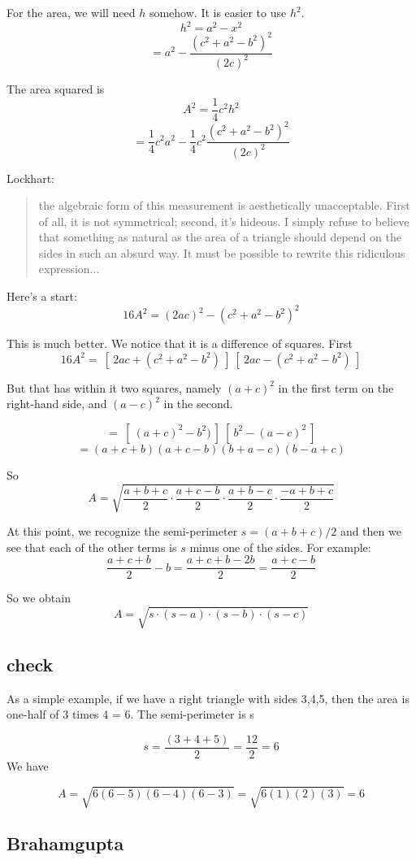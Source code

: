 \documentclass[11pt, oneside]{article}
\begin{document}
For the area, we will need $h$ somehow.  It is easier to use $h^2$.
\[ h^2 = a^2 - x^2 \]
\[ = a^2 - \frac{(c^2 + a^2-b^2)^2}{(2c)^2}  \]

The area squared is
\[ A^2 = \frac{1}{4}c^2 h^2 \]
\[ = \frac{1}{4} c^2 a^2 - \frac{1}{4} c^2 \frac{(c^2 + a^2-b^2)^2}{(2c)^2}  \]

Lockhart:

\begin{quote}
the algebraic form of this measurement is aesthetically unacceptable. First of all, it is not symmetrical; second, it's hideous. I simply refuse to believe that something as natural as the area of a triangle should depend on the sides in such an absurd way. It must be possible to rewrite this ridiculous expression...
\end{quote}

Here's a start:
\[ 16A^2 = (2ac)^2 - (c^2 + a^2-b^2)^2 \]

This is much better.  We notice that it is a difference of squares.  First
\[ 16A^2 = \ [ \ 2ac + (c^2 + a^2-b^2) \ ] \ [ \ 2ac - (c^2 + a^2-b^2) \ ]  \]

But that has within it two squares, namely $(a + c)^2$ in the first term on the right-hand side, and $(a - c)^2$ in the second.

\[ = \ [ \ (a + c)^2 -b^2) \ ] \ [ \ b^2 - (a - c)^2 \ ]  \]
\[ =  (a + c + b)(a + c - b)(b + a - c)(b - a + c) \]

So
\[ A = \sqrt{\frac{a + b + c}{2}  \cdot \frac{a + c - b}{2}  \cdot \frac{a + b - c}{2}  \cdot \frac{-a + b + c}{2} } \]

At this point, we recognize the semi-perimeter $s = (a + b + c)/2$ and then we see that each of the other terms is $s$ minus one of the sides.  For example:
\[ \frac{a + c + b}{2} - b = \frac{a + c + b - 2b}{2} = \frac{a + c - b}{2} \]

So we obtain
\[ A = \sqrt{s \cdot (s - a) \cdot (s - b) \cdot (s - c) } \]
\subsection*{check}
As a simple example, if we have a right triangle with sides 3,4,5, then the area is one-half of 3 times 4 = 6.  The semi-perimeter is s

\[ s = \frac{(3 + 4 + 5)}{2} = \frac{12}{2} = 6 \]
We have

\[ A =  \sqrt { 6 (6-5) (6-4) (6-3) } =  \sqrt { 6 (1) (2) (3) } = 6 \]

\subsection*{Brahamgupta}
\end{document}
